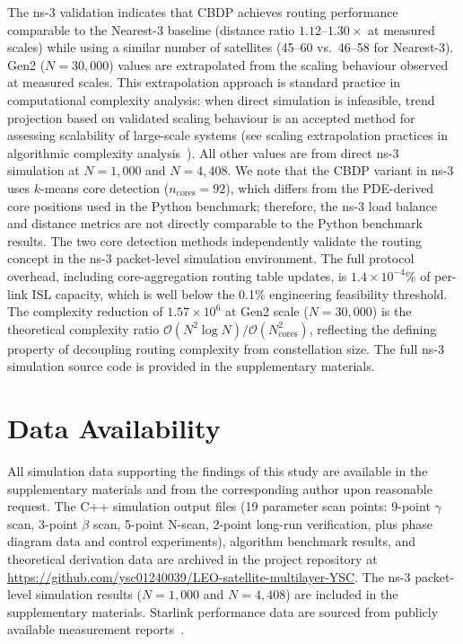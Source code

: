 \documentclass[sn-nature,pdflatex]{sn-jnl}
\begin{document}
The ns-3 validation indicates that CBDP achieves routing performance comparable to the Nearest-3 baseline (distance ratio $1.12$--$1.30\times$ at measured scales) while using a similar number of satellites (45--60 vs.\ 46--58 for Nearest-3).
Gen2 ($N=30,000$) values are extrapolated from the scaling behaviour observed at measured scales. This extrapolation approach is standard practice in computational complexity analysis: when direct simulation is infeasible, trend projection based on validated scaling behaviour is an accepted method for assessing scalability of large-scale systems (see scaling extrapolation practices in algorithmic complexity analysis~\cite{ns3_manual}). All other values are from direct ns-3 simulation at $N=1,000$ and $N=4,408$.
We note that the CBDP variant in ns-3 uses $k$-means core detection ($n_{\text{cores}}=92$), which differs from the PDE-derived core positions used in the Python benchmark; therefore, the ns-3 load balance and distance metrics are not directly comparable to the Python benchmark results. The two core detection methods independently validate the routing concept in the ns-3 packet-level simulation environment.
The full protocol overhead, including core-aggregation routing table updates, is $1.4 \times 10^{-4}\%$ of per-link ISL capacity, which is well below the 0.1\% engineering feasibility threshold.
The complexity reduction of $1.57\times10^6$ at Gen2 scale ($N=30,000$) is the theoretical complexity ratio $\mathcal{O}(N^2\log N)/\mathcal{O}(N_{\text{cores}}^2)$, reflecting the defining property of decoupling routing complexity from constellation size.
The full ns-3 simulation source code is provided in the supplementary materials.

\section*{Data Availability}
All simulation data supporting the findings of this study are available in the supplementary materials and from the corresponding author upon reasonable request. The C++ simulation output files (19 parameter scan points: 9-point $\gamma$ scan, 3-point $\beta$ scan, 5-point N-scan, 2-point long-run verification, plus phase diagram data and control experiments), algorithm benchmark results, and theoretical derivation data are archived in the project repository at \url{https://github.com/ysc01240039/LEO-satellite-multilayer-YSC}. The ns-3 packet-level simulation results ($N=1,000$ and $N=4,408$) are included in the supplementary materials. Starlink performance data are sourced from publicly available measurement reports~\cite{starlink_2025_update,ookla_2025_starlink}.
\end{document}
